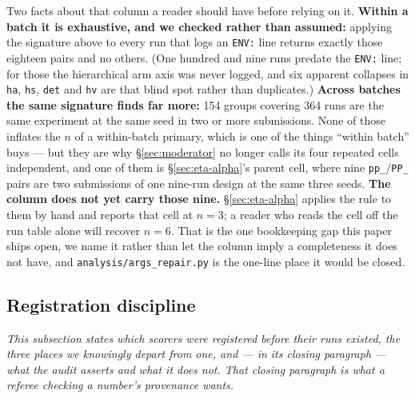 \documentclass[10pt,letterpaper]{article}
\newcommand{\arm}[1]{\texttt{#1}}
\begin{document}
Two facts about that column a reader should have before relying on it. \textbf{Within a batch it
is exhaustive, and we checked rather than assumed:} applying the signature above to every run
that logs an \texttt{ENV:} line returns exactly those eighteen pairs and no others. (One hundred
and nine runs predate the \texttt{ENV:} line; for those the hierarchical arm axis was never
logged, and six apparent collapses in \arm{ha}, \arm{hs}, \arm{det} and \arm{hv} are that blind
spot rather than duplicates.) \textbf{Across batches the same signature finds far more:} 154
groups covering 364 runs are the same experiment at the same seed in two or more submissions.
None of those inflates the $n$ of a within-batch primary, which is one of the things ``within
batch'' buys --- but they are why \S\ref{sec:moderator} no longer calls its four repeated cells
independent, and one of them is \S\ref{sec:eta-alpha}'s parent cell, where nine
\arm{pp\_}/\arm{PP\_} pairs are two submissions of one nine-run design at the same three seeds.
\textbf{The column does not yet carry those nine.} \S\ref{sec:eta-alpha} applies the rule to them
by hand and reports that cell at $n = 3$; a reader who reads the cell off the run table alone
will recover $n = 6$. That is the one bookkeeping gap this paper ships open, we name it rather
than let the column imply a completeness it does not have, and \texttt{analysis/args\_repair.py}
is the one-line place it would be closed.

\subsection{Registration discipline}
\label{sec:registration}

\emph{This subsection states which scorers were registered before their runs existed, the three
places we knowingly depart from one, and --- in its closing paragraph --- what the audit asserts
and what it does not. That closing paragraph is what a referee checking a number's provenance
wants.}
\end{document}
